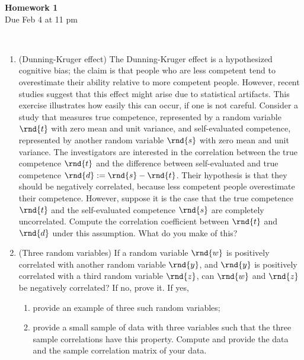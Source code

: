 \documentclass[12pt,twoside]{article}
\begin{document}
\begin{center}
{\large{\textbf{Homework 1}} } \vspace{0.2cm}\\
Due Feb 4 at 11 pm
\\
\end{center}
\\

\begin{enumerate}

\item (Dunning-Kruger effect) The Dunning-Kruger effect is a hypothesized cognitive bias; the claim is that people who are less competent tend to overestimate their ability relative to more competent people. However, recent studies suggest that this effect might arise due to statistical artifacts. This exercise illustrates how easily this can occur, if one is not careful. Consider a study that measures true competence, represented by a random variable $\rnd{t}$ with zero mean and unit variance, and self-evaluated competence, represented by another random variable $\rnd{s}$ with zero mean and unit variance. The investigators are interested in the correlation between the true competence $\rnd{t}$ and the difference between self-evaluated and true competence $\rnd{d}:=\rnd{s} - \rnd{t}$. Their hypothesis is that they should be negatively correlated, because less competent people overestimate their competence. However, suppose it is the case that the true competence $\rnd{t}$ and the self-evaluated competence $\rnd{s}$ are completely uncorrelated. Compute the correlation coefficient between $\rnd{t}$ and $\rnd{d}$ under this assumption. What do you make of this?

\item (Three random variables) If a random variable $\rnd{w}$ is positively correlated with another random variable $\rnd{y}$, and $\rnd{y}$ is positively correlated with a third random variable $\rnd{z}$, can $\rnd{w}$ and $\rnd{z}$ be negatively correlated? If no, prove it. If yes,
\begin{enumerate} 
\item provide an example of three such random variables;
\item provide a small sample of data with three variables such that the three sample correlations have this property. Compute and provide the data and the sample correlation matrix of your data.
\end{enumerate}


\end{enumerate}
\end{document}
